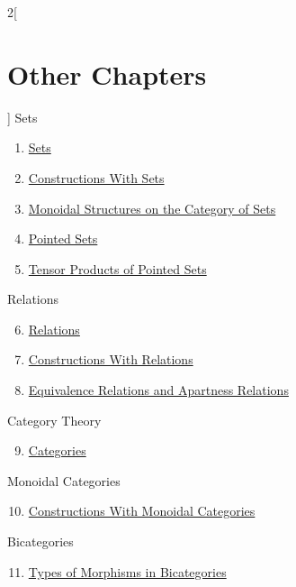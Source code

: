 \begin{multicols}{2}[\section{Other Chapters}]
\noindent
Sets
\begin{enumerate}
\item \hyperref[sets:section-phantom]{Sets}
\item \hyperref[constructions-with-sets:section-phantom]{Constructions With Sets}
\item \hyperref[monoidal-structures-on-the-category-of-sets:section-phantom]{Monoidal Structures on the Category of Sets}
\item \hyperref[pointed-sets:section-phantom]{Pointed Sets}
\item \hyperref[tensor-products-of-pointed-sets:section-phantom]{Tensor Products of Pointed Sets}
\end{enumerate}
Relations
\begin{enumerate}
\setcounter{enumi}{5}
\item \hyperref[relations:section-phantom]{Relations}
\item \hyperref[constructions-with-relations:section-phantom]{Constructions With Relations}
\item \hyperref[equivalence-relations-and-apartness-relations:section-phantom]{Equivalence Relations and Apartness Relations}
\end{enumerate}
Category Theory
\begin{enumerate}
\setcounter{enumi}{8}
\item \hyperref[categories:section-phantom]{Categories}
\end{enumerate}
Monoidal Categories
\begin{enumerate}
\setcounter{enumi}{9}
\item \hyperref[constructions-with-monoidal-categories:section-phantom]{Constructions With Monoidal Categories}
\end{enumerate}
Bicategories
\begin{enumerate}
\setcounter{enumi}{10}
\item \hyperref[types-of-morphisms-in-bicategories:section-phantom]{Types of Morphisms in Bicategories}
\end{enumerate}
\end{multicols}
